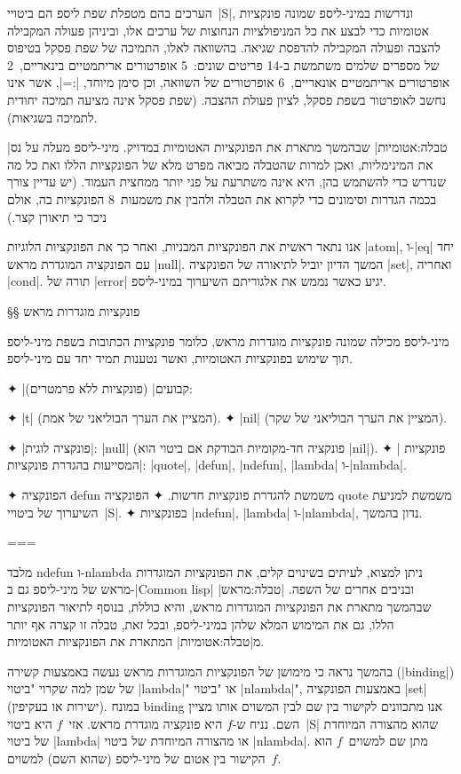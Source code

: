 הערכים בהם מטפלת שפת ליספ הם ביטויי~\E|S|, ונדרשות במיני-ליספ שמונה פונקציות
אטומיות כדי לבצע את כל המניפולציות הנחוצות של ערכים אלו, וביניהן פעולה המקבילה
להצבה ופעולה המקבילה להדפסת שגיאה. בהשוואה לאלו, התמיכה של שפת פסקל בטיפוס של
מספרים שלמים משתמשת ב-14 פריטים שונים:~5 אופרטורים אריתמטיים בינאריים,~2
אופרטורים אריתמטיים אונאריים,~6 אופרטורים של השוואה, וכן סימן מיוחד, \E|:=|,
אשר אינו נחשב לאופרטור בשפת פסקל, לציון פעולת ההצבה. (שפת פסקל אינה מציעה תמיכה
יחודית לתמיכה בשגיאות).

|טבלה:אטומיות| שבהמשך מתארת את הפונקציות האטומיות במדויק. מיני-ליספ מעלה
על נס את המינימליות, ואכן למרות שהטבלה מביאה מפרט מלא של הפונקציות הללו ואת כל
מה שנדרש כדי להשתמש בהן, היא אינה משתרעת על פני יותר ממחצית העמוד. (יש עדיין
צורך בכמה הגדרות וסימונים כדי לקרוא את הטבלה ולהבין את משמעות~8 הפונקציות בה,
אולם ניכר כי תיאורן קצר.)

אנו נתאר ראשית את הפונקציות המבניות, ואחר כך את הפונקציות הלוגיות \E|atom|,
ו-\E|eq| יחד עם הפונקציה המוגדרת מראש \E|null|. המשך הדיון יוביל לתיאורה של
הפונקציה \E|set|, ואחריה \E|cond|. תורה של \E|error| יגיע כאשר נממש את
אלגוריתם השיערוך במיני-ליספ.

§§ פונקציות מוגדרות מראש

מיני-ליספ מכילה שמונה פונקציות מוגדרות מראש, כלומר פונקציות הכתובות בשפת
מיני-ליספ תוך שימוש בפונקציות האטומיות, ואשר נטענות תמיד יחד עם מיני-ליספ.

✦ \ע|קבועים| (פונקציות ללא פרמטרים):
\begin{itemize}
  ✦ \E|t| (המציין את הערך הבוליאני של אמת).
  ✦ \E|nil| (המציין את הערך הבוליאני של שקר).
\end{itemize}
✦ \ע|פונקציה לוגית|: \E|null| (פונקציה חד-מקומיות הבודקת אם ביטוי הוא \E|nil|).
✦ \ע| פונקציות המסייעות בהגדרת פונקציות|:
\E|quote|, \E|defun|, \E|ndefun|, \E|lambda| ו-\E|nlambda|.
\begin{itemize}
  ✦ הפונקציה defun משמשת להגדרת פונקציות חדשות.
  ✦ הפונקציה quote משמשת למניעת השיערוך של ביטויי~\E|S|.
  ✦ בפונקציות \E|ndefun|, \E|lambda| ו-\E|nlambda|, נדון בהמשך.
\end{itemize}
===

מלבד ndefun ו-nlambda ניתן למצוא, לעיתים בשינוים קלים, את הפונקציות המוגדרות
מראש של מיני-ליספ גם ב-\E|Common lisp| ובניבים אחרים של השפה.
|טבלה:מראש| שבהמשך מתארת את הפונקציות המוגדרות מראש, והיא כוללת, בנוסף
לתיאור הפונקציות הללו, גם את המימוש המלא שלהן במיני-ליספ, ובכל זאת, טבלה זו
קצרה אף יותר מ|טבלה:אטומיות| המתארת את הפונקציות האטומיות.

בהמשך נראה כי מימושן של הפונקציות המוגדרות מראש נעשה באמצעות קשירה
(\E|binding|) של שמן למה שקרוי "ביטוי \E|lambda|" או "ביטוי \E|nlambda|",
באמצעות הפונקציה \E|set| (ישירות או בעקיפין). במונח binding אנו מתכוונים לקישור
בין שם לבין המשוים אותו מציין השם. נניח ש-$f$ היא פונקציה מוגדרת מראש. אזי~$f$
היא ביטוי~\E|S| שהוא מהצורה המיוחדת של ביטוי \E|lambda| או מהצורה המיוחדת של
ביטוי \E|nlambda|. מתן שם למשוים~$f$ הוא הקישור בין אטום של מיני-ליספ (שהוא
השם) למשוים~$f$.

